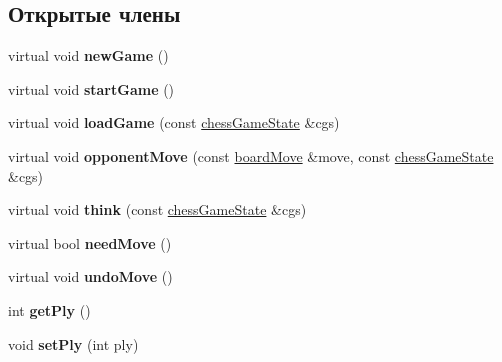 \subsection*{Открытые члены}
\begin{DoxyCompactItemize}
\item 
\hypertarget{class_a_i_a6cda26d3bf7238b1a7ea3725bf4aabb7}{}virtual void {\bfseries new\+Game} ()\label{class_a_i_a6cda26d3bf7238b1a7ea3725bf4aabb7}

\item 
\hypertarget{class_a_i_a522cd4b638779e79a22bdca7c720117e}{}virtual void {\bfseries start\+Game} ()\label{class_a_i_a522cd4b638779e79a22bdca7c720117e}

\item 
\hypertarget{class_a_i_aa8be74c446a6c45782b751603eacfc9c}{}virtual void {\bfseries load\+Game} (const \hyperlink{classchess_game_state}{chess\+Game\+State} \&cgs)\label{class_a_i_aa8be74c446a6c45782b751603eacfc9c}

\item 
\hypertarget{class_a_i_a86e46248e15fae19e4e12905f2b57f29}{}virtual void {\bfseries opponent\+Move} (const \hyperlink{classboard_move}{board\+Move} \&move, const \hyperlink{classchess_game_state}{chess\+Game\+State} \&cgs)\label{class_a_i_a86e46248e15fae19e4e12905f2b57f29}

\item 
\hypertarget{class_a_i_a2f3438ffaf88c009c07fee1839fabd05}{}virtual void {\bfseries think} (const \hyperlink{classchess_game_state}{chess\+Game\+State} \&cgs)\label{class_a_i_a2f3438ffaf88c009c07fee1839fabd05}

\item 
\hypertarget{class_a_i_a4e39220413e38cc5ab65c127422cd5b1}{}virtual bool {\bfseries need\+Move} ()\label{class_a_i_a4e39220413e38cc5ab65c127422cd5b1}

\item 
\hypertarget{class_a_i_a7b9d1d6efcece382034e191ed9a6ed78}{}virtual void {\bfseries undo\+Move} ()\label{class_a_i_a7b9d1d6efcece382034e191ed9a6ed78}

\item 
\hypertarget{class_a_i_ad77351f99c6ad80f9d675b9affec7f44}{}int {\bfseries get\+Ply} ()\label{class_a_i_ad77351f99c6ad80f9d675b9affec7f44}

\item 
\hypertarget{class_a_i_a28d820a70a78d7ce290179c10a869c78}{}void {\bfseries set\+Ply} (int ply)\label{class_a_i_a28d820a70a78d7ce290179c10a869c78}

\end{DoxyCompactItemize}
